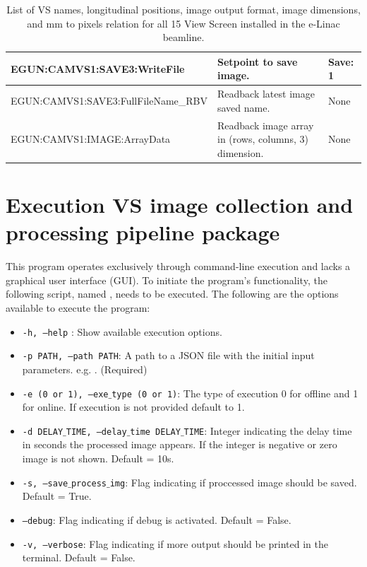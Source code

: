 \documentclass{article}
\begin{document}
\begin{table}[h!]
{\begin{tabular}{| m{8cm}   | m{4.5cm}   | m{4.5cm}|}
                \hline
                EGUN:CAMVS1:SAVE3:WriteFile  & Setpoint to save image. &  Save: 1 \\ 
                \hline
                EGUN:CAMVS1:SAVE3:FullFileName\_RBV  & Readback latest image saved name. & None  \\ 
                \hline
                EGUN:CAMVS1:IMAGE:ArrayData  &  Readback image array in (rows, columns, 3) dimension. & None  \\ 
                \hline
             \end{tabular}
        }
    \caption{List of VS names, longitudinal positions, image output format, image dimensions, and mm to pixels relation for all 15 View Screen installed in the e-Linac beamline.}
    \label{tab:vs_pv_list}
\end{table}

\newpage
\section{Execution VS image collection and processing pipeline package} \label{appendix:exe_pipeline}
This program operates exclusively through command-line execution and lacks a graphical user interface (GUI). To initiate the program's functionality, the following script, named , needs to be executed. The following are the options available to execute the program:

\begin{itemize}
    \item \texttt{-h, --help} : Show available execution options.
    \item \texttt{-p PATH, --path PATH}:  A path to a JSON file with the initial input parameters. e.g. . (Required)
    \item \texttt{-e (0 or 1), --exe$\_$type (0 or 1)}: The type of execution 0 for offline and 1 for online. If execution is not provided default to 1.
    \item \texttt{-d DELAY$\_$TIME, --delay$\_$time DELAY$\_$TIME}: Integer indicating the delay time in seconds the processed image appears. If the integer is negative or zero image is not shown. Default = 10s.
    \item \texttt{-s, --save$\_$process$\_$img}: Flag indicating if proccessed image should be saved. Default = True.
    \item \texttt{--debug}: Flag indicating if debug is activated. Default = False.
    \item \texttt{-v, --verbose}: Flag indicating if more output should be printed in the terminal. Default = False.
\end{itemize}
\end{document}
